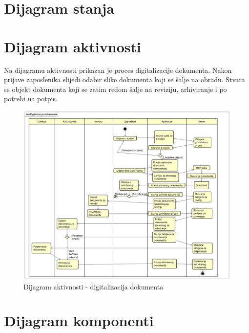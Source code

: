 			
			
			
			\eject
		
		\section{Dijagram stanja}
			
			
			
			
			
			\eject 
		
		\section{Dijagram aktivnosti}
			
			

			{Na dijagramu aktivnosti prikazan je proces digitalizacije dokumenta. Nakon prijave zaposlenika slijedi odabir slike dokumenta koji se šalje na obradu. Stvara se objekt dokumenta koji se zatim redom šalje na reviziju, arhiviranje i po potrebi na potpis.}

			 \begin{figure}[H]
			 	\includegraphics[width=\textwidth]{slike/dijagramAktivnosti.png}
			 	\caption{Dijagram aktivnosti - digitalizacija dokumenta}
			 	\label{fig:dijagramAktivnosti}
			 \end{figure}
			\eject
		\section{Dijagram komponenti}
		
		
